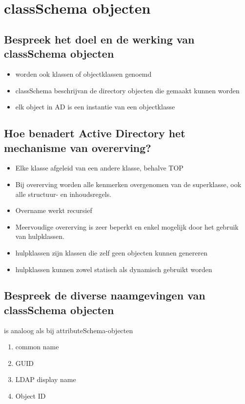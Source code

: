 \chapter{classSchema objecten}

\section{Bespreek het doel en de werking van classSchema objecten}

\begin{itemize}
	\item worden ook klassen of objectklassen genoemd
	\item classSchema beschrijvan de directory objecten die gemaakt kunnen
		worden
	\item elk object in AD is een instantie van een objectklasse
\end{itemize}

\section{Hoe benadert Active Directory het mechanisme van overerving?}

\begin{itemize}
	\item Elke klasse afgeleid van een andere klasse, behalve TOP
	\item Bij overerving worden alle kenmerken overgenomen van de
		superklasse, ook alle structuur- en inhoudsregels.
	\item Overname werkt recursief
	\item Meervoudige overerving is zeer beperkt en enkel mogelijk door het
		gebruik van hulpklassen.
	\item hulpklassen zijn klassen die zelf geen objecten kunnen genereren
	\item hulpklassen kunnen zowel statisch als dynamisch gebruikt worden
\end{itemize}

\section{Bespreek de diverse naamgevingen van classSchema objecten}

is analoog als bij attributeSchema-objecten
\begin{enumerate}
	\item common name
	\item GUID
	\item LDAP display name
	\item Object ID
\end{enumerate}

